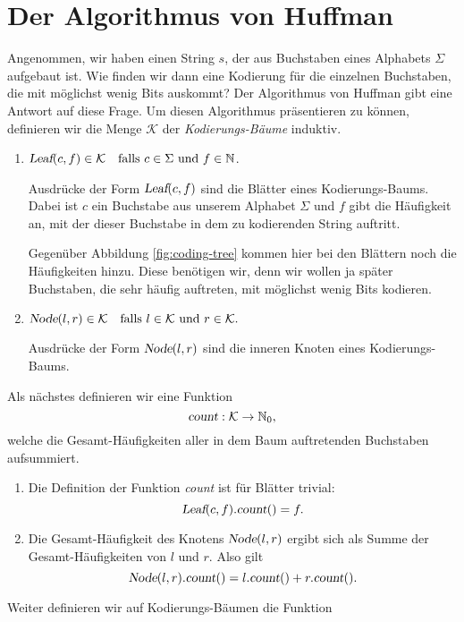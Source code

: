 \section[Huffman's Algorithm]{Der Algorithmus von Huffman}
Angenommen, wir haben einen String $s$, der aus Buchstaben eines Alphabets $\Sigma$
aufgebaut ist.  Wie finden wir dann eine Kodierung f\"ur die einzelnen Buchstaben, die
mit m\"oglichst wenig Bits auskommt?  Der Algorithmus von Huffman gibt eine Antwort auf diese
Frage. Um diesen Algorithmus pr\"asentieren zu k\"onnen, definieren wir die Menge
$\mathcal{K}$ der \emph{Kodierungs-B\"aume} induktiv.  
\begin{enumerate}
\item $\textsl{Leaf}(c,f) \in \mathcal{K} \quad \mbox{falls $c \in \Sigma$ und $f \in {\mathbb N}$}$.

      Ausdr\"ucke der Form $\textsl{Leaf}(c,f)$ sind die Bl\"atter eines Kodierungs-Baums.
      Dabei ist $c$ ein Buchstabe aus unserem Alphabet $\Sigma$ und $f$ gibt die
      H\"aufigkeit an, mit der dieser Buchstabe in dem zu kodierenden String auftritt.

      Gegen\"uber Abbildung \ref{fig:coding-tree} kommen hier bei den Bl\"attern noch die
      H\"aufigkeiten hinzu.  Diese ben\"otigen wir, denn wir wollen ja sp\"ater Buchstaben,
      die sehr h\"aufig auftreten, mit m\"oglichst wenig Bits kodieren.  

\item $\textsl{Node}(l,r) \in \mathcal{K} \quad 
       \mbox{falls $l \in\mathcal{K}$ und $r \in \mathcal{K}$.}$ 

      Ausdr\"ucke der Form $\textsl{Node}(l,r)$ sind die inneren Knoten eines
      Kodierungs-Baums.  
\end{enumerate}
Als n\"achstes  definieren wir eine Funktion 
\[  \textsl{count} : \mathcal{K} \rightarrow {\mathbb N}_0, \]
welche die  Gesamt-H\"aufigkeiten aller in dem Baum auftretenden Buchstaben aufsummiert.
\begin{enumerate}
\item Die Definition der Funktion \textsl{count} ist f\"ur Bl\"atter trivial:
      \[ \textsl{Leaf}(c,f).\textsl{count}() = f. \]
\item Die Gesamt-H\"aufigkeit des Knotens $\textsl{Node}(l,r)$
      ergibt sich als Summe der Gesamt-H\"aufigkeiten von $l$ und $r$. Also gilt
      \[ \textsl{Node}(l,r).\textsl{count}() = l.\textsl{count}() + r.\textsl{count}(). \]
\end{enumerate}
Weiter definieren wir auf Kodierungs-B\"aumen die Funktion
